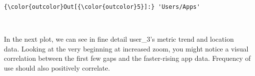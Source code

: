 \documentclass[11pt]{article}
\begin{document}
\begin{Verbatim}[commandchars=\\\{\}]
{\color{outcolor}Out[{\color{outcolor}5}]:} 'Users/Apps'
\end{Verbatim}
            
    \begin{center}
    \end{center}
    { \hspace*{\fill} \\}
    
    In the next plot, we can see in fine detail user\_3's metric trend and
location data. Looking at the very beginning at increased zoom, you
might notice a visual correlation between the first few gaps and the
faster-rising app data. Frequency of use should also positively
correlate.
\end{document}
